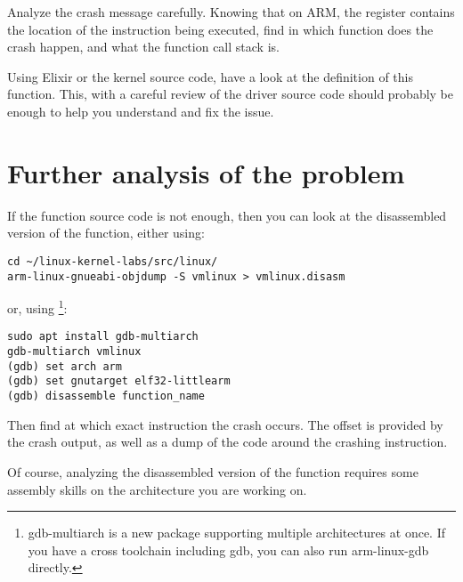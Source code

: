 Analyze the crash message carefully. Knowing that on ARM, the 
register contains the location of the instruction being executed, find
in which function does the crash happen, and what the function call
stack is.

Using Elixir or the kernel source code, have a look at the definition of this
function. This, with a careful review of the driver source code should
probably be enough to help you understand and fix the issue.

\section{Further analysis of the problem}

If the function source code is not enough, then you can look at the
disassembled version of the function, either using:

\begin{verbatim}
cd ~/linux-kernel-labs/src/linux/
arm-linux-gnueabi-objdump -S vmlinux > vmlinux.disasm
\end{verbatim}

or, using \footnote{gdb-multiarch is a new package
supporting multiple architectures at once. If you have a cross
toolchain including gdb, you can also run arm-linux-gdb directly.}:

\begin{verbatim}
sudo apt install gdb-multiarch
gdb-multiarch vmlinux
(gdb) set arch arm
(gdb) set gnutarget elf32-littlearm
(gdb) disassemble function_name
\end{verbatim}

Then find at which exact instruction the crash occurs. The offset is
provided by the crash output, as well as a dump of the code around the
crashing instruction.

Of course, analyzing the disassembled version of the function requires
some assembly skills on the architecture you are working on.
